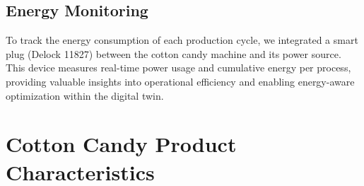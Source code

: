 \subsection{Energy Monitoring}
To track the energy consumption of each production cycle, we integrated a smart plug (Delock 11827) between the cotton candy machine and its power source. This device measures real-time power usage and cumulative energy per process, providing valuable insights into operational efficiency and enabling energy-aware optimization within the digital twin.

\section{Cotton Candy Product Characteristics}



